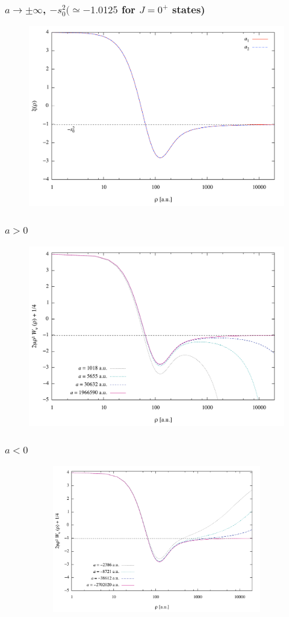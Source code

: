 \documentclass{beamer}
\begin{document}
\begin{frame}
\frametitle{$a \rightarrow \pm \infty$, $-s_0^2 (\simeq -1.0125$ for $J=0^+$ states)}
\begin{figure}
	\includegraphics[width=0.8\linewidth]{infty.pdf}
\end{figure}
\end{frame}

\begin{frame}
\frametitle{$a >0$}
\begin{figure}
	\includegraphics[width=0.8\linewidth]{finite_positive_a.pdf}
\end{figure}
\end{frame}

\begin{frame}
\frametitle{$a<0$}
\begin{figure}
	\begin{figure}
		\includegraphics[width=0.8\linewidth]{finite_negative_a.pdf}
	\end{figure}
\end{figure}
\end{frame}
\end{document}
